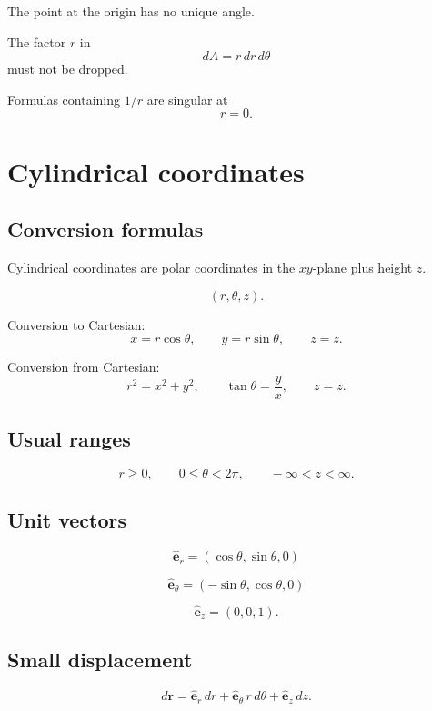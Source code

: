 The point at the origin has no unique angle.

The factor \(r\) in
\[
    dA=r\,dr\,d\theta
\]
must not be dropped.

Formulas containing \(1/r\) are singular at
\[
    r=0.
\]

\section{Cylindrical coordinates}
\label{app:D.2}

\subsection*{Conversion formulas}

Cylindrical coordinates are polar coordinates in the \(xy\)-plane plus height \(z\).

\[
\boxed{
    (r,\theta,z).
}
\]

Conversion to Cartesian:
\[
\boxed{
    x=r\cos\theta,
    \qquad
    y=r\sin\theta,
    \qquad
    z=z.
}
\]

Conversion from Cartesian:
\[
\boxed{
    r^2=x^2+y^2,
    \qquad
    \tan\theta=\frac yx,
    \qquad
    z=z.
}
\]

\subsection*{Usual ranges}

\[
\boxed{
    r\ge0,
    \qquad
    0\le\theta<2\pi,
    \qquad
    -\infty<z<\infty.
}
\]

\subsection*{Unit vectors}

\[
\boxed{
    \widehat{\mathbf e}_r=(\cos\theta,\sin\theta,0)
}
\]

\[
\boxed{
    \widehat{\mathbf e}_\theta=(-\sin\theta,\cos\theta,0)
}
\]

\[
\boxed{
    \widehat{\mathbf e}_z=(0,0,1).
}
\]

\subsection*{Small displacement}

\[
\boxed{
    d\mathbf r
    =
    \widehat{\mathbf e}_r\,dr
    +
    \widehat{\mathbf e}_\theta\,r\,d\theta
    +
    \widehat{\mathbf e}_z\,dz.
}
\]

